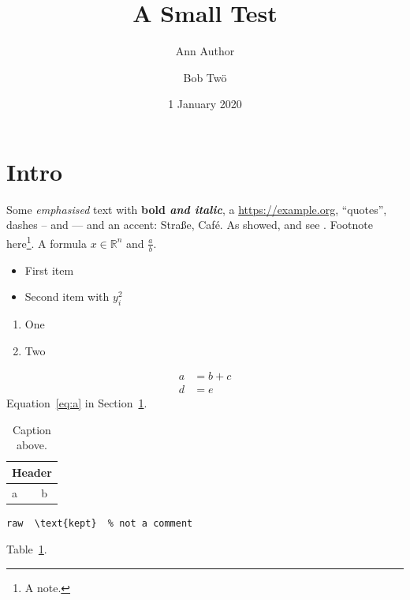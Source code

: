 \documentclass{article}
\title{A Small Test}
\author{Ann Author \and Bob Tw\"o}
\date{1 January 2020}
\newcommand{\R}{\mathbb{R}}
\newcommand{\term}[1]{\emph{#1}}
\begin{document}
\maketitle
\section{Intro}\label{sec:intro}
Some \term{emphasised} text with \textbf{bold \emph{and italic}}, a \url{https://example.org},
``quotes'', dashes -- and --- and an accent: Stra\ss e, Caf\'e.
As \textcite{delta2020} showed, and see \parencite[see][p.~4]{delta2020,rho2019}.
Footnote here\footnote{A note.}. A formula $x \in \R^n$ and $\frac{a}{b}$.
\begin{itemize}
  \item First item
  \item Second item with $y_i^2$
\end{itemize}
\begin{enumerate}
  \item One
  \item Two
\end{enumerate}
\begin{align}
  a &= b + c \label{eq:a}\\
  d &= e \nonumber
\end{align}
Equation~\eqref{eq:a} in Section~\ref{sec:intro}. 
\begin{table}
  \caption{Caption above.}\label{tab:x}
  \begin{tabular}{|l|c|}
    \hline
    \multicolumn{2}{|c|}{Header} \\ \hline
    a & b \\
    \hline
  \end{tabular}
\end{table}
\begin{verbatim}
raw  \text{kept}  % not a comment
\end{verbatim}
Table~\ref{tab:x}.
\printbibliography
\end{document}
